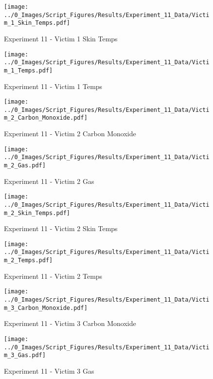 	\begin{figure}[H]
		\centering
		\texttt{[image: ../0\_Images/Script\_Figures/Results/Experiment\_11\_Data/Victim\_1\_Skin\_Temps.pdf]}
		\caption[]{Experiment 11 - Victim 1 Skin Temps}
	\end{figure}
 
	\clearpage

	\begin{figure}[H]
		\centering
		\texttt{[image: ../0\_Images/Script\_Figures/Results/Experiment\_11\_Data/Victim\_1\_Temps.pdf]}
		\caption[]{Experiment 11 - Victim 1 Temps}
	\end{figure}
 

	\begin{figure}[H]
		\centering
		\texttt{[image: ../0\_Images/Script\_Figures/Results/Experiment\_11\_Data/Victim\_2\_Carbon\_Monoxide.pdf]}
		\caption[]{Experiment 11 - Victim 2 Carbon Monoxide}
	\end{figure}
 
	\clearpage

	\begin{figure}[H]
		\centering
		\texttt{[image: ../0\_Images/Script\_Figures/Results/Experiment\_11\_Data/Victim\_2\_Gas.pdf]}
		\caption[]{Experiment 11 - Victim 2 Gas}
	\end{figure}
 

	\begin{figure}[H]
		\centering
		\texttt{[image: ../0\_Images/Script\_Figures/Results/Experiment\_11\_Data/Victim\_2\_Skin\_Temps.pdf]}
		\caption[]{Experiment 11 - Victim 2 Skin Temps}
	\end{figure}
 
	\clearpage

	\begin{figure}[H]
		\centering
		\texttt{[image: ../0\_Images/Script\_Figures/Results/Experiment\_11\_Data/Victim\_2\_Temps.pdf]}
		\caption[]{Experiment 11 - Victim 2 Temps}
	\end{figure}
 

	\begin{figure}[H]
		\centering
		\texttt{[image: ../0\_Images/Script\_Figures/Results/Experiment\_11\_Data/Victim\_3\_Carbon\_Monoxide.pdf]}
		\caption[]{Experiment 11 - Victim 3 Carbon Monoxide}
	\end{figure}
 
	\clearpage

	\begin{figure}[H]
		\centering
		\texttt{[image: ../0\_Images/Script\_Figures/Results/Experiment\_11\_Data/Victim\_3\_Gas.pdf]}
		\caption[]{Experiment 11 - Victim 3 Gas}
	\end{figure}
 

